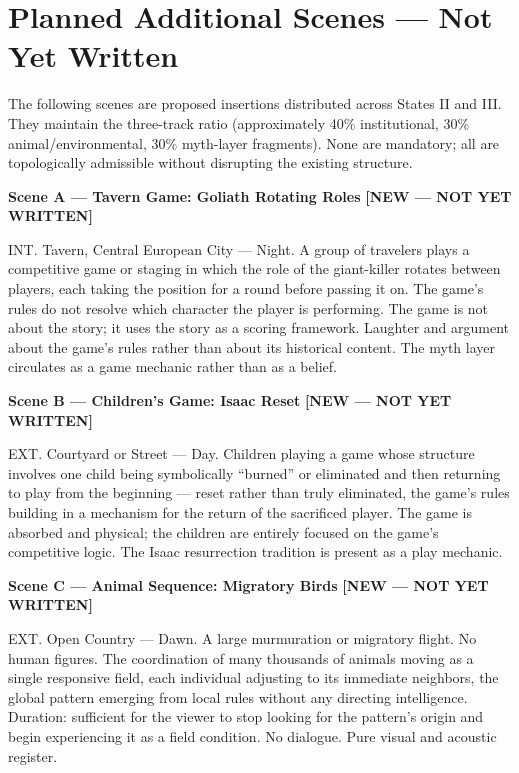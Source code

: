 \documentclass[12pt, oneside]{amsart}
\newcommand{\statusnew}{{\small\bfseries\color{newscene}[NEW --- NOT YET WRITTEN]}}
\begin{document}
\section{Planned Additional Scenes — Not Yet Written}

\noindent The following scenes are proposed insertions distributed across States II and III. They maintain the three-track ratio (approximately 40\% institutional, 30\% animal/environmental, 30\% myth-layer fragments). None are mandatory; all are topologically admissible without disrupting the existing structure.

\bigskip

\noindent\textbf{Scene A --- Tavern Game: Goliath Rotating Roles} \statusnew

\noindent INT. Tavern, Central European City --- Night. A group of travelers plays a competitive game or staging in which the role of the giant-killer rotates between players, each taking the position for a round before passing it on. The game's rules do not resolve which character the player is performing. The game is not about the story; it uses the story as a scoring framework. Laughter and argument about the game's rules rather than about its historical content. The myth layer circulates as a game mechanic rather than as a belief.

\bigskip

\noindent\textbf{Scene B --- Children's Game: Isaac Reset} \statusnew

\noindent EXT. Courtyard or Street --- Day. Children playing a game whose structure involves one child being symbolically ``burned'' or eliminated and then returning to play from the beginning --- reset rather than truly eliminated, the game's rules building in a mechanism for the return of the sacrificed player. The game is absorbed and physical; the children are entirely focused on the game's competitive logic. The Isaac resurrection tradition is present as a play mechanic.

\bigskip

\noindent\textbf{Scene C --- Animal Sequence: Migratory Birds} \statusnew

\noindent EXT. Open Country --- Dawn. A large murmuration or migratory flight. No human figures. The coordination of many thousands of animals moving as a single responsive field, each individual adjusting to its immediate neighbors, the global pattern emerging from local rules without any directing intelligence. Duration: sufficient for the viewer to stop looking for the pattern's origin and begin experiencing it as a field condition. No dialogue. Pure visual and acoustic register.
\end{document}
